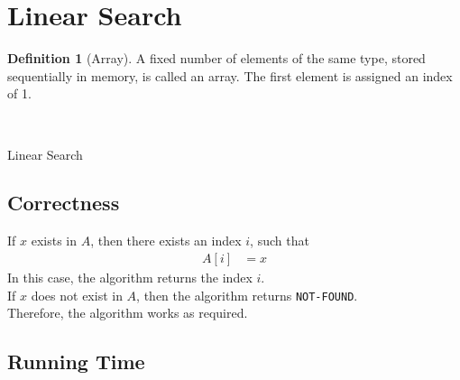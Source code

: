 \documentclass[titlepage, fleqn, a4paper, 12pt, twoside]{article}
\theoremstyle{definition}
\newtheorem{definition}{Definition}
\theoremstyle{theorem}
\let\And\relax
\begin{document}
\section{Linear Search}

\begin{definition}[Array]
	A fixed number of elements of the same type, stored sequentially in memory, is called an array.
	The first element is assigned an index of 1.
	\begin{figure}[H]
		\begin{bytefield}[bitwidth = 3em, lsb=1]{9}
			\\
		\end{bytefield}
	\end{figure}
\end{definition}

\begin{algorithm}
	\begin{algorithmic}[1]
		\Statex
		\While{$\texttt{found} = \False \And i \le n$}
			\Else
			\EndIf
		\EndWhile
		\Else
		\EndIf
	\end{algorithmic}
	\caption{Linear Search}
	\label{alg:Linear_Search}
\end{algorithm}

\subsection{Correctness}

If $x$ exists in $A$, then there exists an index $i$, such that
\begin{align*}
	A[i] & = x
\end{align*}
In this case, the algorithm returns the index $i$.\\
If $x$ does not exist in $A$, then the algorithm returns \texttt{NOT-FOUND}.\\
Therefore, the algorithm works as required.

\subsection{Running Time}
\end{document}
